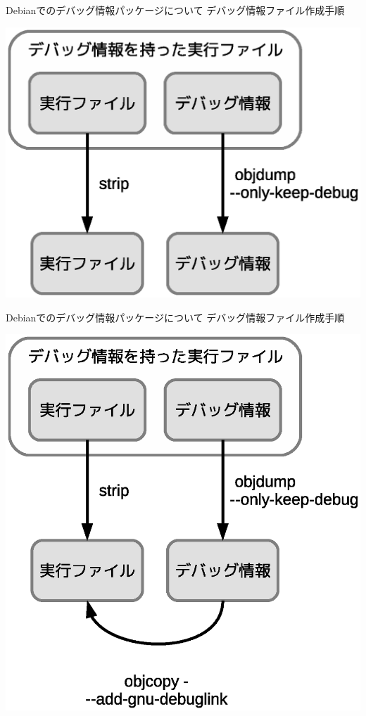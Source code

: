 \begin{frame}{Debianでのデバッグ情報パッケージについて}
デバッグ情報ファイル作成手順
\begin{center}
\includegraphics[width=1.0\hsize]{image2012-gum/ddebug-gum-image-data-debug-data02.eps}
\end{center}
\end{frame}

\begin{frame}{Debianでのデバッグ情報パッケージについて}
デバッグ情報ファイル作成手順
\begin{center}
\includegraphics[width=1.0\hsize]{image2012-gum/ddebug-gum-image-data-debug-data03.eps}
\end{center}
\end{frame}

